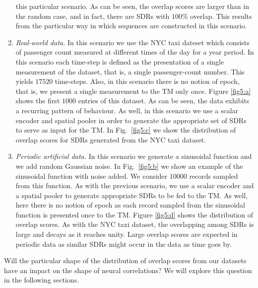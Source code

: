 \documentclass[11pt,letterpaper]{article}
\begin{document}
\begin{enumerate}
            this particular scenario.
            As can be seen, the overlap scores are larger than in the random case, and in fact, there
            are SDRs with $100\%$ overlap. This results from the particular way in which sequences are
            constructed in this scenario.
            \item\emph{Real-world data.} In this scenario we use the NYC taxi dateset which consists
            of passenger count measured at different times of the day for a year period.
            In this scenario each time-step is defined as the presentation of a single measurement
            of the dataset, that is, a single passenger-count number.
            This yields $17520$ time-steps. Also, in this scenario there is no notion of epoch, that
            is, we present a single measurement to the TM only once.
            Figure \ref{fig5:a} shows the first $1000$ entries of this dataset. As can be seen, the data
            exhibits a recurring pattern of behaviour.
            As well, in this scenario we use a scalar encoder and spatial pooler in order to generate
            the appropriate set of SDRs to serve as input for the TM.
            In Fig.~\ref{fig5:c} we show the distribution of overlap scores for SDRs generated from the
            NYC taxi dataset.
            \item\emph{Periodic artificial data.} In this scenario we generate a sinusoidal function
            and we add random Gaussian noise. 
            In Fig.~\ref{fig5:b} we show an example of the sinusoidal function with noise added. 
            We consider $10000$ records sampled from this function.
            As with the previous scenario, we use a scalar encoder and
            a spatial pooler to generate appropriate SDRs to be fed to the TM.
            As well, here there is no notion of epoch as each record sampled from the sinusoidal function
            is presented once to the TM.
            Figure \ref{fig5:d} shows the distribution of overlap scores. As with the NYC taxi dataset, 
            the overlapping among SDRs is large and decays as it reaches unity.
            Large overlap scores are expected in periodic data as similar SDRs might occur in the data
            as time goes by.
        \end{enumerate}

        Will the particular shape of the distribution of overlap scores from our datasets have an impact
        on the shape of neural correlations?
        We will explore this question in the following sections.
\end{document}
